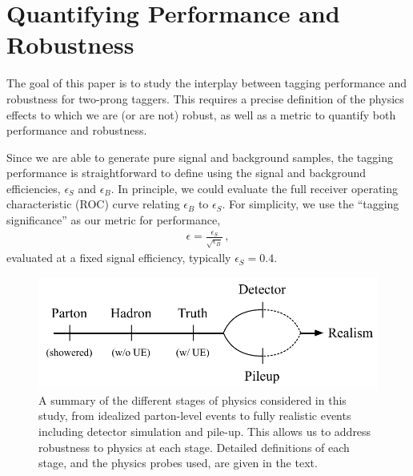 \documentclass[11pt]{cernrep}
\begin{document}
\section{Quantifying Performance and Robustness}\label{jetsub_2prong_sec:pres}


The goal of this paper is to study the interplay between tagging performance and robustness for two-prong taggers.
%
This requires a precise definition of the physics effects to which we are (or are not) robust, as well as a metric to quantify both performance and robustness.


Since we are able to generate pure signal and background samples, the tagging performance is straightforward to define using the signal and background efficiencies, $\epsilon_S$ and $\epsilon_B$.
%
In principle, we could evaluate the full receiver operating characteristic (ROC) curve relating $\epsilon_B$ to $\epsilon_S$.
%
For simplicity, we use the ``tagging significance'' as our metric for performance,
\begin{align}
\epsilon=\frac{\epsilon_S}{\sqrt{\epsilon_B}}\,,
\end{align}
evaluated at a fixed signal efficiency, typically $\epsilon_S = 0.4$.

\begin{figure}[t]
\begin{center}
\includegraphics[width=0.75\columnwidth]{jetsub_2prong_realism_levels}
\end{center}
\caption{A summary of the different stages of physics considered in
  this study, from idealized parton-level events to fully realistic
  events including detector simulation and pile-up.
  This allows us to
  address robustness to physics at each stage.
  Detailed definitions of
  each stage, and the physics probes used, are given in the text.
   }
\label{jetsub_2prong_fig:realism}
\end{figure}
\end{document}
